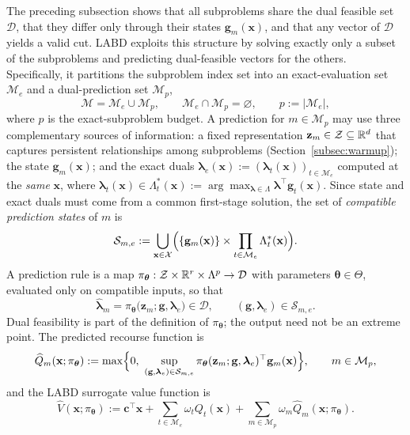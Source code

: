 The preceding subsection shows that all subproblems share the dual feasible set $\mathcal D$, that they differ only through their states $\mathbf g_m(\mathbf x)$, and that any vector of $\mathcal D$ yields a valid cut. LABD exploits this structure by solving exactly only a subset of the subproblems and predicting dual-feasible vectors for the others. Specifically, it partitions the subproblem index set into an exact-evaluation set $\mathcal M_e$ and a dual-prediction set $\mathcal M_p$,
\begin{equation}\label{eq:partition}
\mathcal M=\mathcal M_e\cup\mathcal M_p,\qquad \mathcal M_e\cap\mathcal M_p=\varnothing,\qquad p:=|\mathcal M_e|,
\end{equation}
where $p$ is the exact-subproblem budget. A prediction for $m\in\mathcal M_p$ may use three complementary sources of information: a fixed representation $\mathbf z_m\in\mathcal Z\subseteq\mathbb{R}^d$ that captures persistent relationships among subproblems (Section~\ref{subsec:warmup}); the state $\mathbf g_m(\mathbf x)$; and the exact duals $\boldsymbol\lambda_e(\mathbf x):=(\boldsymbol\lambda_t(\mathbf x))_{t\in\mathcal M_e}$ computed at the \emph{same} $\mathbf x$, where $\boldsymbol\lambda_t(\mathbf x)\in\Lambda_t^*(\mathbf x):=\arg\max_{\boldsymbol\lambda\in\Lambda}\boldsymbol\lambda^\top\mathbf g_t(\mathbf x)$. Since state and exact duals must come from a common first-stage solution, the set of \emph{compatible prediction states} of $m$ is
\begin{equation}\label{eq:compatible}
\mathcal S_{m,e}:=\bigcup_{\mathbf x\in\mathcal X}\Bigl(\{\mathbf g_m(\mathbf x)\}\times\prod_{t\in\mathcal M_e}\Lambda_t^*(\mathbf x)\Bigr).
\end{equation}
A prediction rule is a map $\pi_{\boldsymbol\theta}:\mathcal Z\times\mathbb{R}^r\times\Lambda^p\to\mathcal D$ with parameters $\boldsymbol\theta\in\Theta$, evaluated only on compatible inputs, so that
\begin{equation}\label{eq:prediction-rule}
\widehat{\boldsymbol\lambda}_m=\pi_{\boldsymbol\theta}\bigl(\mathbf z_m;\mathbf g,\boldsymbol\lambda_e\bigr)\in\mathcal D,\qquad (\mathbf g,\boldsymbol\lambda_e)\in\mathcal S_{m,e}.
\end{equation}
Dual feasibility is part of the definition of $\pi_{\boldsymbol\theta}$; the output need not be an extreme point. The predicted recourse function is
\begin{equation}\label{eq:predicted-recourse}
\widehat Q_m(\mathbf x;\pi_{\boldsymbol\theta}):=\max\Bigl\{0,\ \sup_{(\mathbf g,\boldsymbol\lambda_e)\in\mathcal S_{m,e}}\pi_{\boldsymbol\theta}(\mathbf z_m;\mathbf g,\boldsymbol\lambda_e)^\top\mathbf g_m(\mathbf x)\Bigr\},\qquad m\in\mathcal M_p,
\end{equation}
and the LABD surrogate value function is
\begin{equation}\label{eq:surrogate}
\widehat V(\mathbf x;\pi_{\boldsymbol\theta}):=\mathbf c^\top\mathbf x+\sum_{t\in\mathcal M_e}\omega_tQ_t(\mathbf x)+\sum_{m\in\mathcal M_p}\omega_m\widehat Q_m(\mathbf x;\pi_{\boldsymbol\theta}).
\end{equation}

